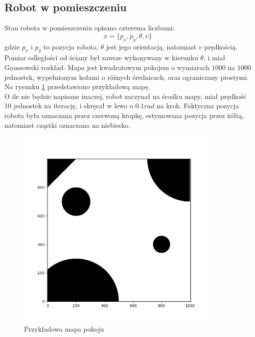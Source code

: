 \subsection{Robot w pomieszczeniu} \label{robot_w_pomieszczeniu_desc}
Stan robota w pomieszczeniu opisano czterema liczbami:
\begin{equation*}
	x = \{p_x,p_y,\theta,v\}
\end{equation*}
gdzie $p_x$ i $p_y$ to pozycja robota, $\theta$ jest jego orientacją, natomiast $v$ prędkością. Pomiar odległości od ściany był zawsze wykonywany w kierunku $\theta$, i miał Gaussowski rozkład. Mapa jest kwadratowym pokojem o wymiarach $1000$ na $1000$ jednostek, wypełnionym kołami o różnych średnicach, oraz ograniczany prostymi. Na rysunku \ref{przykladowa_mapa_pokoju} przedstawiono przykładową mapę.\\
O ile nie będzie napisane inaczej, robot zaczynał na środku mapy, miał prędkość 10 jednostek na iterację, i skręcał w lewo o $0.1rad$ na krok. Faktyczna pozycja robota była oznaczana przez czerwoną kropkę, estymowana pozycja przez żółtą, natomiast cząstki oznaczano na niebiesko.
\begin{figure}[H]
	\begin{center}
		\includegraphics[width=10cm]{./przykladowa_mapa_pokoju.png}
		\caption{Przykładowa mapa pokoju}
		\label{przykladowa_mapa_pokoju}
	\end{center}
\end{figure}
